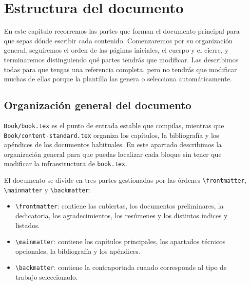 %

\chapter{Estructura del documento}
\label{cha:estructura-documento}

En este capítulo recorremos las partes que forman el documento principal para que sepas dónde escribir cada contenido. Comenzaremos por su organización general, seguiremos el orden de las páginas iniciales, el cuerpo y el cierre, y terminaremos distinguiendo qué partes tendrás que modificar. Las describimos todas para que tengas una referencia completa, pero no tendrás que modificar muchas de ellas porque la plantilla las genera o selecciona automáticamente.

\section{Organización general del documento}
\label{sec:estr-del-docum}

\texttt{Book/book.tex} es el punto de entrada estable que compilas, mientras que \texttt{Book/content-standard.tex} organiza los capítulos, la bibliografía y los apéndices de los documentos habituales. En este apartado describimos la organización general para que puedas localizar cada bloque sin tener que modificar la infraestructura de \texttt{book.tex}.

El documento se divide en tres partes gestionadas por las órdenes \texttt{\textbackslash{}frontmatter}, \texttt{\textbackslash{}mainmatter} y \texttt{\textbackslash{}backmatter}:

\begin{itemize}
  \item \texttt{\textbackslash{}frontmatter}: contiene las cubiertas, los documentos preliminares, la dedicatoria, los agradecimientos, los resúmenes y los distintos índices y listados.
  \item \texttt{\textbackslash{}mainmatter}: contiene los capítulos principales, los apartados técnicos opcionales, la bibliografía y los apéndices.
  \item \texttt{\textbackslash{}backmatter}: contiene la contraportada cuando corresponde al tipo de trabajo seleccionado.
\end{itemize}

